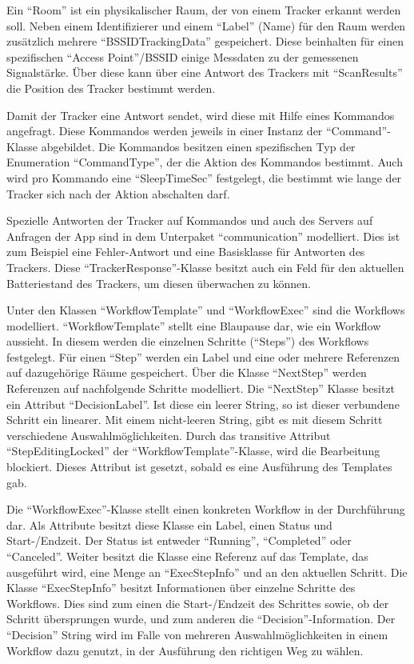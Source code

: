 Ein \enquote{Room} ist ein physikalischer Raum, der von einem Tracker erkannt werden soll.
Neben einem Identifizierer und einem \enquote{Label} (Name) für den Raum werden zusätzlich mehrere \enquote{BSSIDTrackingData} gespeichert.
Diese beinhalten für einen spezifischen \enquote{Access Point}/\gls{BSSID} einige Messdaten zu der gemessenen Signalstärke.
Über diese kann über eine Antwort des Trackers mit \enquote{ScanResults} die Position des Tracker bestimmt werden.

Damit der Tracker eine Antwort sendet, wird diese mit Hilfe eines Kommandos angefragt.
Diese Kommandos werden jeweils in einer Instanz der \enquote{Command}-Klasse abgebildet.
Die Kommandos besitzen einen spezifischen Typ der Enumeration \enquote{CommandType}, der die Aktion des Kommandos bestimmt.
Auch wird pro Kommando eine \enquote{SleepTimeSec} festgelegt, die bestimmt wie lange der Tracker sich nach der Aktion abschalten darf.

Spezielle Antworten der Tracker auf Kommandos und auch des Servers auf Anfragen der App sind in dem Unterpaket \enquote{communication} modelliert.
Dies ist zum Beispiel eine Fehler-Antwort und eine Basisklasse für Antworten des Trackers.
Diese \enquote{TrackerResponse}-Klasse besitzt auch ein Feld für den aktuellen Batteriestand des Trackers, um diesen überwachen zu können.

Unter den Klassen \enquote{WorkflowTemplate} und \enquote{WorkflowExec} sind die Workflows modelliert.
\enquote{WorkflowTemplate} stellt eine Blaupause dar, wie ein Workflow aussieht.
In diesem werden die einzelnen Schritte (\enquote{Steps}) des Workflows festgelegt.
Für einen \enquote{Step} werden ein Label und eine oder mehrere Referenzen auf dazugehörige Räume gespeichert.
Über die Klasse \enquote{NextStep} werden Referenzen auf nachfolgende Schritte modelliert.
Die \enquote{NextStep} Klasse besitzt ein Attribut \enquote{DecisionLabel}.
Ist diese ein leerer String, so ist dieser verbundene Schritt ein linearer.
Mit einem nicht-leeren String, gibt es mit diesem Schritt verschiedene Auswahlmöglichkeiten.
Durch das transitive Attribut \enquote{StepEditingLocked} der \enquote{WorkflowTemplate}-Klasse, wird die Bearbeitung blockiert.
Dieses Attribut ist gesetzt, sobald es eine Ausführung des Templates gab.

Die \enquote{WorkflowExec}-Klasse stellt einen konkreten Workflow in der Durchführung dar.
Als Attribute besitzt diese Klasse ein Label, einen Status und Start-/Endzeit.
Der Status ist entweder \enquote{Running}, \enquote{Completed} oder \enquote{Canceled}.
Weiter besitzt die Klasse eine Referenz auf das Template, das ausgeführt wird, eine Menge an \enquote{ExecStepInfo} und an den aktuellen Schritt.
Die Klasse \enquote{ExecStepInfo} besitzt Informationen über einzelne Schritte des Workflows.
Dies sind zum einen die Start-/Endzeit des Schrittes sowie, ob der Schritt übersprungen wurde, und zum anderen die \enquote{Decision}-Information.
Der \enquote{Decision} String wird im Falle von mehreren Auswahlmöglichkeiten in einem Workflow dazu genutzt, in der Ausführung den richtigen Weg zu wählen.

